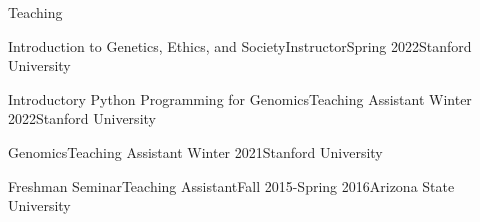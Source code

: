 \documentclass[]{kyvernitis-resume}
\begin{document}
\begin{section}{Teaching}
\begin{subsectionnobullet}{Introduction to Genetics, Ethics, and Society}{Instructor}{Spring 2022}{Stanford University}
    \item\vspace{-5mm}
\end{subsectionnobullet}
\begin{subsectionnobullet}{Introductory Python Programming for Genomics}{Teaching Assistant}{
Winter 2022}{Stanford University}
    \item\vspace{-5mm}
\end{subsectionnobullet}
\begin{subsectionnobullet}{Genomics}{Teaching Assistant}{
Winter 2021}{Stanford University}
    \item\vspace{-5mm}
\end{subsectionnobullet}
\begin{subsectionnobullet}{Freshman Seminar}{Teaching Assistant}{Fall 2015-Spring 2016}{Arizona State University}
\item \vspace{-5mm}
\end{subsectionnobullet}

\end{section}
\end{document}
